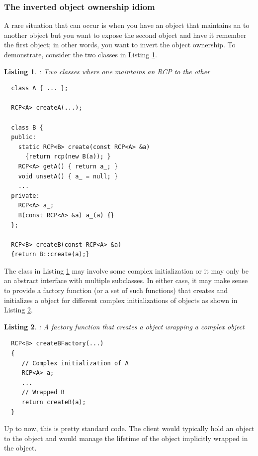 \documentclass[pdf,ps2pdf,11pt]{SANDreport}
\newtheorem{listing}{Listing}
\begin{document}
%
{}\subsubsection{The inverted object ownership idiom}
\label{sec:inverting-obj-ownership}
%

A rare situation that can occur is when you have an object that
maintains an {} to another object but you want to expose
the second object and have it remember the first object; in other
words, you want to invert the object ownership.  To demonstrate,
consider the two classes in Listing {}\ref{listing:B_owns_A_decl}.

\begin{listing}: Two classes where one maintains an RCP to the other \\
\label{listing:B_owns_A_decl}
{\small\begin{verbatim}
  class A { ... };

  RCP<A> createA(...);

  class B {
  public:
    static RCP<B> create(const RCP<A> &a)
      {return rcp(new B(a)); }
    RCP<A> getA() { return a_; }
    void unsetA() { a_ = null; }
    ...
  private:
    RCP<A> a_;
    B(const RCP<A> &a) a_(a) {}
  };

  RCP<B> createB(const RCP<A> &a)
  {return B::create(a);}
\end{verbatim}}
\end{listing}

The class {} in Listing {}\ref{listing:B_owns_A_decl} may
involve some complex initialization or it may only be an abstract
interface with multiple subclasses.  In either case, it may make sense
to provide a factory function (or a set of such functions) that
creates and initializes a {} object for different complex
initializations of {} objects as shown in Listing
{}\ref{listing:createBFactory}.

\begin{listing}: A factory function that creates a {} object
wrapping a complex {} object \\
\label{listing:createBFactory}
{\small\begin{verbatim}
  RCP<B> createBFactory(...)
  {
     // Complex initialization of A
     RCP<A> a;
     ...
     // Wrapped B
     return createB(a);
  }
\end{verbatim}}
\end{listing}

Up to now, this is pretty standard code.  The client would typically
hold an {} object to the {} object and would
manage the lifetime of the {} object implicitly wrapped in
the {} object.
\end{document}

